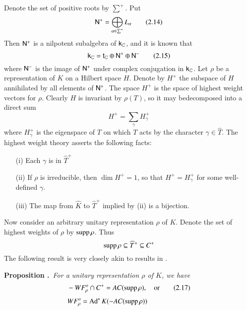Denote the set of positive roots by $\sum^{+}$. Put
\begin{equation*}
\mathsf{N}^{+}=\bigoplus\limits_{\alpha\in \sum^{+}}L_{\alpha}\tag{2.14}\label{art3-eq2.14}
\end{equation*}
Then $\mathsf{N}^{+}$ is a nilpotent subalgebra of $\mathsf{k}_{\mathbb{C}}$, and it is known that
\begin{equation*}
\mathsf{k}_{\mathbb{C}}=\mathsf{t}_{\mathbb{C}}\oplus \mathsf{N}^{+}\oplus \mathsf{N}^{-}\tag{2.15}\label{art3-eq2.15}
\end{equation*}
where $\mathsf{N}^{-}$ is the image of $\mathsf{N}^{+}$ under complex conjugation in $\mathsf{k}_{\mathbb{C}}$. Let $\rho$ be a representation of $K$ on a Hilbert space $H$. Denote by $H^{+}$ the subspace of $H$ annihilated by all elements of $\mathsf{N}^{+}$. The space $H^{+}$ is the space of highest weight vectors for $\rho$. Clearly $H$ is invariant by $\rho(T)$, so it may be\pageoriginale decomposed into a direct sum
\begin{equation*}
H^{+}=\sum\limits_{\gamma}H^{+}_{\gamma}\tag{2.16}\label{art3-eq2.16}
\end{equation*}
where $H^{+}_{\gamma}$ is the eigenspace of $T$ on which $T$ acts by the character $\gamma\in \widehat{T}$. The highest weight theory asserts the following facts:
\begin{itemize}
\item[(i)] Each $\gamma$ is in $\widehat{T}^{+}$

\item[(ii)] If $\rho$ is irreducible, then $\dim H^{+}=1$, so that $H^{+}=H^{+}_{\gamma}$ for some well-defined $\gamma$.

\item[(iii)] The map from $\widehat{K}$ to $\widehat{T}^{+}$ implied by (ii) is a bijection.
\end{itemize}

Now consider an arbitrary unitary representation $\rho$ of $K$. Denote the set of highest weights of $\rho$ by $\operatorname{supp} \rho$. Thus
$$
\operatorname{supp} \rho\subseteq \widehat{T}^{+}\subseteq C^{+}
$$
The following result is very closely akin to results in \cite{art3-K-V}.

\medskip
\noindent
{\bf Proposition .\label{art3-prop2.3}}~{\em For a unitary representation $\rho$ of $K$, we have}
\begin{align*}
& -WF^{o}_{\rho}\cap C^{+}=AC(\operatorname{supp} \rho),\quad\text{or}\tag{2.17}\label{art3-eq2.17}\\[3pt]
& WF^{o}_{\rho}=\operatorname{Ad}^{*}K(-AC(\operatorname{supp} \rho))
\end{align*}

